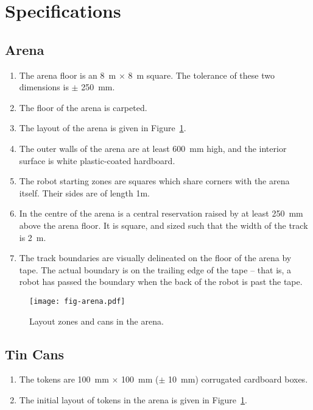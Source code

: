\section{Specifications}
\label{sec:specs}

\subsection{Arena}
\label{spec:arena}

\begin{enumerate}
  \item The arena floor is an \SI{8}{m} $\times$ \SI{8}{m} square. The tolerance
        of these two dimensions is $\pm$ \SI{250}{mm}.
  \item The floor of the arena is carpeted.
  \item The layout of the arena is given in Figure~\ref{fig:arena}.
  \item The outer walls of the arena are at least \SI{600}{mm} high, and the
        interior surface is white plastic-coated hardboard.
  \item The robot starting zones are squares which share corners with the arena
        itself. Their sides are of length \si{1}{m}.
  \item In the centre of the arena is a central reservation raised by
        at least \SI{250}{mm} above the arena floor. It is square, and
        sized such that the width of the track is \SI{2}{m}.
  \item The track boundaries are visually delineated on the floor of the arena
        by tape. The actual boundary is on the trailing edge of the tape --
        that is, a robot has passed the boundary when the back of the robot
        is past the tape.
\end{enumerate}

\begin{figure}
  \texttt{[image: fig-arena.pdf]}
  \caption{Layout zones and cans in the arena.}
  \label{fig:arena}
\end{figure}

\subsection{Tin Cans}
\label{spec:cans}

\begin{enumerate}
  \item The tokens are \SI{100}{mm} $\times$ \SI{100}{mm} ($\pm$ \SI{10}{mm})
        corrugated cardboard boxes.
  \item The initial layout of tokens in the arena is given in
        Figure~\ref{fig:arena}.
\end{enumerate}

